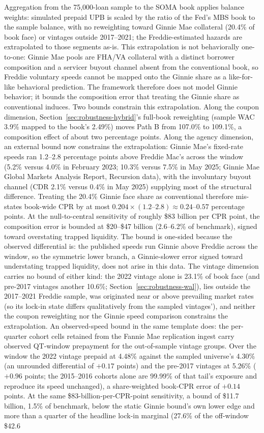\documentclass[12pt]{article}
\begin{document}
Aggregation from the 75,000-loan sample to the SOMA book applies balance weights: simulated prepaid UPB is scaled by the ratio of the Fed's MBS book to the sample balance, with no reweighting toward Ginnie Mae collateral (20.4\% of book face) or vintages outside 2017--2021; the Freddie-estimated hazards are extrapolated to those segments as-is. This extrapolation is not behaviorally one-to-one: Ginnie Mae pools are FHA/VA collateral with a distinct borrower composition and a servicer buyout channel absent from the conventional book, so Freddie voluntary speeds cannot be mapped onto the Ginnie share as a like-for-like behavioral prediction. The framework therefore does not model Ginnie behavior; it bounds the composition error that treating the Ginnie share as conventional induces. Two bounds constrain this extrapolation. Along the coupon dimension, Section~\ref{sec:robustness-hybrid}'s full-book reweighting (sample WAC 3.9\% mapped to the book's 2.49\%) moves Path B from 107.0\% to 109.1\%, a composition effect of about two percentage points. Along the agency dimension, an external bound now constrains the extrapolation: Ginnie Mae's fixed-rate speeds ran 1.2--2.8 percentage points above Freddie Mac's across the window (5.2\% versus 4.0\% in February 2023; 10.3\% versus 7.5\% in May 2025; Ginnie Mae Global Markets Analysis Report, Recursion data), with the involuntary buyout channel (CDR 2.1\% versus 0.4\% in May 2025) supplying most of the structural difference. Treating the 20.4\% Ginnie face share as conventional therefore mis-states book-wide CPR by at most $0.204 \times (1.2\text{--}2.8) \approx 0.24$--$0.57$ percentage points. At the null-to-central sensitivity of roughly \$83 billion per CPR point, the composition error is bounded at \$20--\$47 billion (2.6--6.2\% of benchmark), signed toward overstating trapped liquidity. The bound is one-sided because the observed differential is: the published speeds run Ginnie above Freddie across the window, so the symmetric lower branch, a Ginnie-slower error signed toward understating trapped liquidity, does not arise in this data. The vintage dimension carries no bound of either kind: the 2022 vintage alone is 23.1\% of book face (and pre-2017 vintages another 10.6\%; Section~\ref{sec:robustness-wal}), lies outside the 2017--2021 Freddie sample, was originated near or above prevailing market rates (so its lock-in state differs qualitatively from the sampled vintages'), and neither the coupon reweighting nor the Ginnie speed comparison constrains the extrapolation. An observed-speed bound in the same template does: the per-quarter cohort cells retained from the Fannie Mae replication ingest carry observed QT-window prepayment for the out-of-sample vintage groups. Over the window the 2022 vintage prepaid at 4.48\% against the sampled universe's 4.30\% (an unrounded differential of $+0.17$ points) and the pre-2017 vintages at 5.26\% ($+0.96$ points; the 2015--2016 cohorts alone are 99.99\% of that tail's exposure and reproduce its speed unchanged), a share-weighted book-CPR error of $+0.14$ points. At the same \$83-billion-per-CPR-point sensitivity, a bound of \$11.7 billion, 1.5\% of benchmark, below the static Ginnie bound's own lower edge and more than a quarter of the headline lock-in marginal (27.6\% of the off-window \$42.6 
\end{document}
